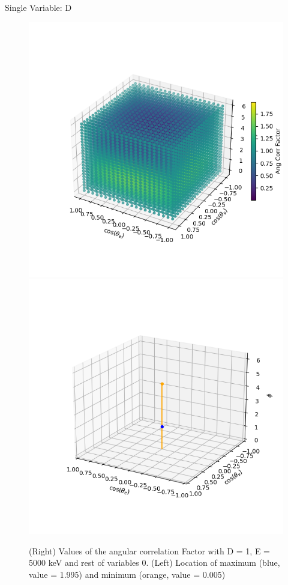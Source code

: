\documentclass{beamer}
\begin{document}
\begin{frame}{Single Variable: D}
	\begin{figure}
		\centering
		\includegraphics[width=0.4\paperwidth]{plots/D_3D_image.png}
		\includegraphics[width=0.4\paperwidth]{plots/D_max_min.png}
		\caption{(Right) Values of the angular correlation Factor with D = 1, E = 5000 keV and rest of variables 0. (Left) Location of maximum (blue, value = 1.995) and minimum (orange, value = 0.005)}	
	\end{figure}
\end{frame}
\end{document}
